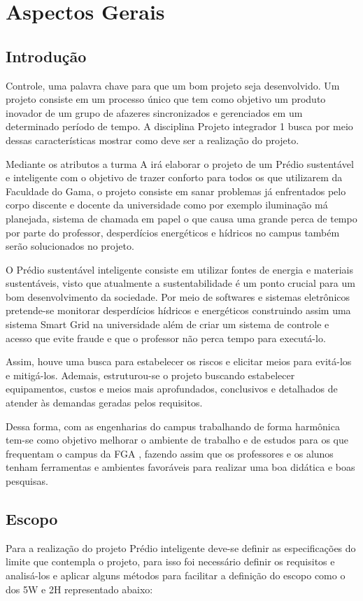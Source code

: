 \part{Aspectos Gerais}
\chapter[Introdução]{Introdução}
Controle, uma palavra chave para que um bom projeto seja desenvolvido. Um
projeto consiste em um processo único que tem como objetivo um produto inovador
de um grupo de afazeres sincronizados e gerenciados em um determinado período de
tempo. A disciplina Projeto integrador 1 busca por meio dessas características
mostrar como deve ser a realização do projeto.

Mediante os atributos a turma A irá elaborar o projeto de um Prédio sustentável
e inteligente com o objetivo de trazer conforto para todos os que utilizarem da
Faculdade do Gama, o projeto consiste em sanar problemas já enfrentados pelo
corpo discente e docente da universidade como por exemplo iluminação má
planejada, sistema de chamada em papel o que causa uma grande perca de tempo por
parte do professor, desperdícios energéticos e hídricos no campus também serão
solucionados no projeto.

O Prédio sustentável inteligente consiste em utilizar fontes de energia e
materiais sustentáveis, visto que atualmente a sustentabilidade é um ponto
crucial para um bom desenvolvimento da sociedade. Por meio de softwares e
sistemas eletrônicos pretende-se monitorar desperdícios hídricos e energéticos
construindo assim uma sistema Smart Grid na universidade além de criar um
sistema de controle e acesso que evite fraude e que o professor não perca tempo
para executá-lo.

Assim, houve uma busca para estabelecer os riscos e elicitar meios para
evitá-los e mitigá-los. Ademais, estruturou-se o projeto buscando estabelecer
equipamentos, custos e meios mais aprofundados, conclusivos e detalhados de
atender às demandas geradas pelos requisitos.

Dessa forma, com as engenharias do campus trabalhando de forma harmônica tem-se
como objetivo melhorar o ambiente de trabalho e de estudos para os que
frequentam o campus da FGA , fazendo assim que os professores e os alunos tenham
ferramentas e ambientes favoráveis para realizar uma boa didática e boas
pesquisas.


\chapter{Escopo}
Para a realização do projeto Prédio inteligente deve-se definir as especificações do limite que contempla o projeto, para isso foi necessário definir os requisitos e analisá-los e aplicar alguns métodos para facilitar a definição do escopo como o dos 5W e 2H representado abaixo:

